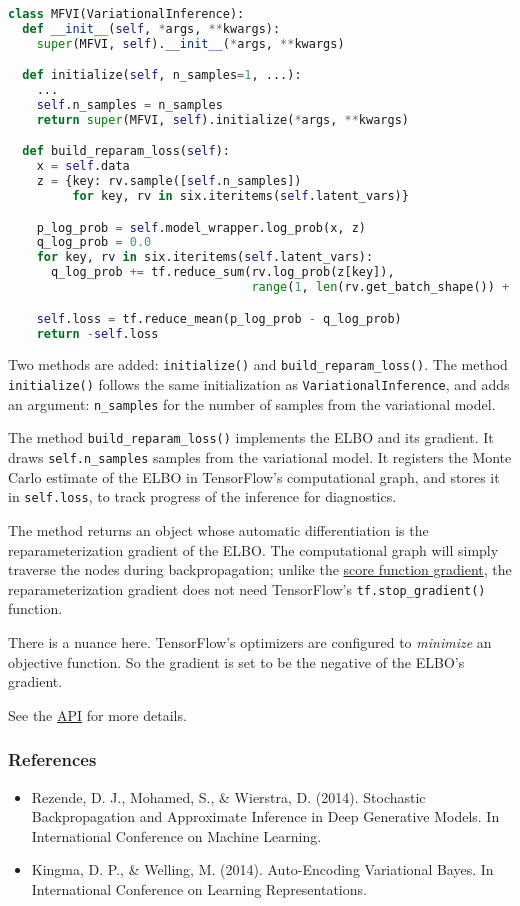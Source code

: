 \begin{lstlisting}[language=Python]
class MFVI(VariationalInference):
  def __init__(self, *args, **kwargs):
    super(MFVI, self).__init__(*args, **kwargs)

  def initialize(self, n_samples=1, ...):
    ...
    self.n_samples = n_samples
    return super(MFVI, self).initialize(*args, **kwargs)

  def build_reparam_loss(self):
    x = self.data
    z = {key: rv.sample([self.n_samples])
         for key, rv in six.iteritems(self.latent_vars)}

    p_log_prob = self.model_wrapper.log_prob(x, z)
    q_log_prob = 0.0
    for key, rv in six.iteritems(self.latent_vars):
      q_log_prob += tf.reduce_sum(rv.log_prob(z[key]),
                                  range(1, len(rv.get_batch_shape()) + 1))

    self.loss = tf.reduce_mean(p_log_prob - q_log_prob)
    return -self.loss
\end{lstlisting}

Two methods are added: \texttt{initialize()} and
\texttt{build_reparam_loss()}. The method \texttt{initialize()}
follows the same initialization as \texttt{VariationalInference}, and
adds an argument: \texttt{n_samples} for the number of samples from
the variational model.

The method \texttt{build_reparam_loss()} implements the ELBO and its
gradient. It draws \texttt{self.n_samples} samples from the
variational model. It registers the Monte Carlo
estimate of the ELBO in TensorFlow's computational graph, and stores it
in \texttt{self.loss}, to track progress of the inference for diagnostics.

The method returns an object whose automatic differentiation is the
reparameterization gradient of the ELBO. The computational graph will
simply traverse the nodes during backpropagation; unlike the
\href{tut_KLqp_score.html}{score function gradient}, the
reparameterization gradient does not need TensorFlow's
\texttt{tf.stop_gradient()} function.

There is a nuance here. TensorFlow's optimizers are configured to
\emph{minimize} an objective function. So the gradient is set to be
the negative of the ELBO's gradient.

See the \href{api/index.html}{API} for more details.

\subsubsection{References}\label{references}

\begin{itemize}
\item
  Rezende, D. J., Mohamed, S., & Wierstra, D. (2014). Stochastic
  Backpropagation and Approximate Inference in Deep Generative Models.
  In International Conference on Machine Learning.
\item
  Kingma, D. P., & Welling, M. (2014). Auto-Encoding Variational
  Bayes. In International Conference on Learning Representations.
\end{itemize}
